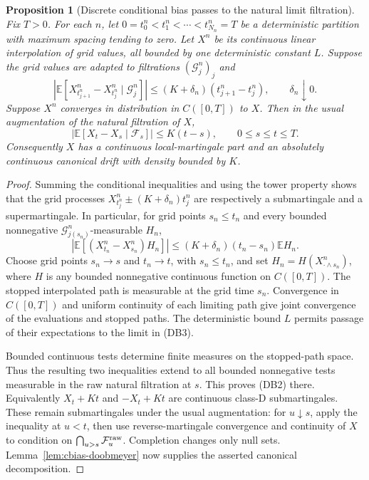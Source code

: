\documentclass[11pt]{article}
\newtheorem{proposition}[theorem]{Proposition}
\theoremstyle{definition}\newtheorem{definition}[theorem]{Definition}
\theoremstyle{remark}\newtheorem{remark}[theorem]{Remark}
\begin{document}
\begin{proposition}[Discrete conditional bias passes to the natural limit filtration]
\label{prop:discrete-bias-transfer}
Fix $T>0$. For each $n$, let
$0=t^n_0<t^n_1<\cdots<t^n_{N_n}=T$ be a deterministic partition
with maximum spacing tending to zero. Let $X^n$ be its continuous
linear interpolation of grid values, all bounded by one deterministic
constant $L$. Suppose the grid values are adapted to filtrations
$(\mathcal G^n_j)_j$ and
\[
 \left|\mathbb E\left[X^n_{t^n_{j+1}}-X^n_{t^n_j}
                         \mid\mathcal G^n_j\right]\right|
 \le (K+\delta_n)(t^n_{j+1}-t^n_j),\qquad\delta_n\downarrow0.
 \tag{DB1}
\]
Suppose $X^n$ converges in distribution in $C([0,T])$ to $X$.
Then in the usual augmentation of the natural filtration of $X$,
\[
 \left|\mathbb E[X_t-X_s\mid\mathcal F_s]\right|
       \le K(t-s),\qquad 0\le s\le t\le T.
 \tag{DB2}
\]
Consequently $X$ has a continuous local-martingale part and an
absolutely continuous canonical drift with density bounded by $K$.
\end{proposition}
\begin{proof}
Summing the conditional inequalities and using the tower property
shows that the grid processes
$X^n_{t^n_j}\pm(K+\delta_n)t^n_j$ are respectively a submartingale
and a supermartingale. In particular, for grid points $s_n\le t_n$
and every bounded nonnegative $\mathcal G^n_{j(s_n)}$-measurable $H_n$,
\[
 \left|\mathbb E[(X^n_{t_n}-X^n_{s_n})H_n]\right|
       \le (K+\delta_n)(t_n-s_n)\mathbb E H_n.
 \tag{DB3}
\]
Choose grid points $s_n\to s$ and $t_n\to t$, with $s_n\le t_n$,
and set $H_n=H(X^n_{\cdot\wedge s_n})$, where $H$ is any bounded
nonnegative continuous function on $C([0,T])$.
The stopped interpolated path is measurable at the grid time $s_n$.
Convergence in $C([0,T])$ and uniform continuity of each limiting
path give joint convergence of the evaluations and stopped paths.
The deterministic bound $L$ permits passage of their expectations to
the limit in (DB3).

Bounded continuous tests determine finite measures on the stopped-path
space. Thus the resulting two inequalities extend to all bounded
nonnegative tests measurable in the raw natural filtration at $s$.
This proves (DB2) there. Equivalently $X_t+Kt$ and $-X_t+Kt$ are
continuous class-D submartingales. These remain submartingales under
the usual augmentation: for $u\downarrow s$, apply the inequality
at $u<t$, then use reverse-martingale convergence and continuity of
$X$ to condition on $\bigcap_{u>s}\mathcal F_u^{\rm raw}$.
Completion changes only null sets. Lemma~\ref{lem:cbias-doobmeyer}
now supplies the asserted canonical decomposition.
\end{proof}
\end{document}
